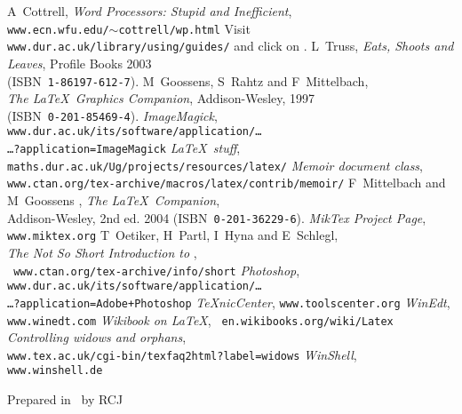 \begin{thebibliography}{9999}%
A~Cottrell, \textsl{Word Processors: Stupid and
Inefficient},
\\ \mbox{}\hfill\texttt{www.ecn.wfu.edu/$\sim$cottrell/wp.html}
Visit \texttt{www.dur.ac.uk/library/using/guides/}
and click on .
L~Truss, \textsl{Eats, Shoots and Leaves}, Profile
  Books 2003\\ \mbox{}\hfill(ISBN~\texttt{1-86197-612-7}).
M~Goossens, S~Rahtz and F~Mittelbach,\\
  \mbox{}\hfill \textsl{The \LaTeX\ Graphics Companion},
  Addison-Wesley, 1997\\  \mbox{}\hfill(ISBN~\texttt{0-201-85469-4}).
 \textsl{ImageMagick}, {\tt%
www.dur.ac.uk/its/software/application/\dots
\\ \mbox{}\hfill\dots?application=ImageMagick}
 \textsl{\LaTeX\ stuff},
	\texttt{maths.dur.ac.uk/Ug/projects/resources/latex/}
 \textsl{Memoir document class},\\ \mbox{}\hfill
   \texttt{www.ctan.org/tex-archive/macros/latex/contrib/memoir/}
F~Mittelbach and M~Goossens \etal, \textsl{The
\LaTeX\ Companion},\\  \mbox{}\hfill Addison-Wesley, 2nd ed. 2004
(ISBN~\texttt{0-201-36229-6}).
 \textsl{MikTex Project Page}, \texttt{www.miktex.org}
T~Oetiker, H~Partl, I~Hyna and E~Schlegl,\\
\mbox{}\hfill
\textsl{The Not So Short Introduction to \LaTeXe},\\ \mbox{}\hfill{\tt
www.ctan.org/tex-archive/info/short}
 \textsl{Photoshop}, {\tt%
www.dur.ac.uk/its/software/application/\dots
\\ \mbox{}\hfill\dots?application=Adobe+Photoshop}
 \textsl{TeXnicCenter}, \texttt{www.toolscenter.org}
 \textsl{WinEdt}, \texttt{www.winedt.com}
 \textsl{Wikibook on \LaTeX}, \texttt{%
	en.wikibooks.org/wiki/Latex}
 \textsl{Controlling widows and orphans}, 
\\ \mbox{}\hfill\texttt{www.tex.ac.uk/cgi-bin/texfaq2html?label=widows}
 \textsl{WinShell}, \texttt{www.winshell.de}
\end{thebibliography}
\vfill
\begin{flushright}\small Prepared in \LaTeXe\ by RCJ\end{flushright}
